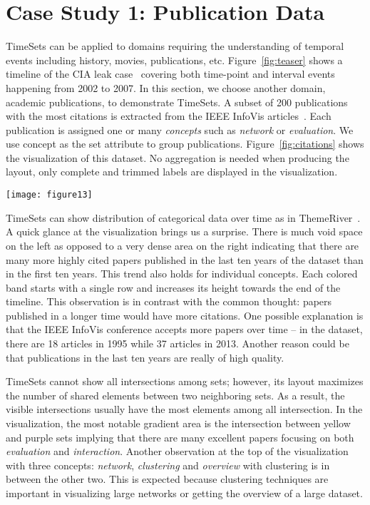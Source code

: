 \section{Case Study 1: Publication Data}

TimeSets can be applied to domains requiring the understanding of temporal events including history, movies, publications, etc. Figure~\ref{fig:teaser} shows a timeline of the CIA leak case~\cite{CIA2007} covering both time-point and interval events happening from 2002 to 2007. In this section, we choose another domain, academic publications, to demonstrate TimeSets. A subset of 200 publications with the most citations is extracted from the IEEE InfoVis articles~\cite{Stasko2013}. Each publication is assigned one or many \textit{concepts} such as \textit{network} or \textit{evaluation}. We use concept as the set attribute to group publications. Figure~\ref{fig:citations} shows the visualization of this dataset. No aggregation is needed when producing the layout, only complete and trimmed labels are displayed in the visualization.

\begin{figure*}[ht]
\centering
\texttt{[image: figure13]}
\caption{TimeSets visualization of 200 publications with the most citations in the IEEE InfoVis conference from 1995 to 2013. Concepts are used to group publications and only eight concepts appearing most in those publications are shown (see the legend in the top left corner).}
\label{fig:citations}
\end{figure*}

TimeSets can show distribution of categorical data over time as in ThemeRiver~\cite{Havre2002}. A quick glance at the visualization brings us a surprise. There is much void space on the left as opposed to a very dense area on the right indicating that there are many more highly cited papers published in the last ten years of the dataset than in the first ten years. This trend also holds for individual concepts. Each colored band starts with a single row and increases its height towards the end of the timeline. This observation is in contrast with the common thought: papers published in a longer time would have more citations. One possible explanation is that the IEEE InfoVis conference accepts more papers over time -- in the dataset, there are 18 articles in 1995 while 37 articles in 2013. Another reason could be that publications in the last ten years are really of high quality.

TimeSets cannot show all intersections among sets; however,  its layout maximizes the number of shared elements between two neighboring sets. As a result, the visible intersections usually have the most elements among all intersection. In the visualization, the most notable gradient area is the intersection between yellow and purple sets implying that there are many excellent papers focusing on both \textit{evaluation} and \textit{interaction}. Another observation at the top of the visualization with three concepts: \textit{network}, \textit{clustering} and \textit{overview} with clustering is in between the other two. This is expected because clustering techniques are important in visualizing large networks or getting the overview of a large dataset.

